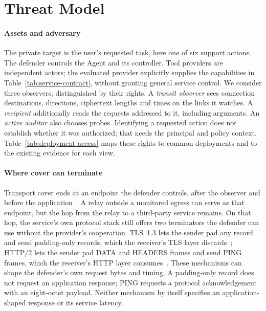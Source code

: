\section{Threat Model}\label{sec:threat}
\paragraph{Assets and adversary}
The private target is the user's requested task, here one of six support actions. The defender controls the Agent and its controller. Tool providers are independent actors; the evaluated provider explicitly supplies the capabilities in Table~\ref{tab:service-contract}, without granting general service control. We consider three observers, distinguished by their rights. A \emph{transit observer} sees connection destinations, directions, ciphertext lengths and times on the links it watches. A \emph{recipient} additionally reads the requests addressed to it, including arguments. An \emph{active auditor} also chooses probes. Identifying a requested action does not establish whether it was authorized; that needs the principal and policy context. Table~\ref{tab:deployment-access} maps these rights to common deployments and to the existing evidence for each view.



\paragraph{Where cover can terminate}
Transport cover ends at an endpoint the defender controls, after the observer and before the application~\cite{apthorpe2019stp}. A relay outside a monitored egress can serve as that endpoint, but the hop from the relay to a third-party service remains. On that hop, the service's own protocol stack still offers two terminators the defender can use without the provider's cooperation. TLS~1.3 lets the sender pad any record and send padding-only records, which the receiver's TLS layer discards~\cite[Sec.~5.4]{rfc8446}; HTTP/2 lets the sender pad DATA and HEADERS frames and send PING frames, which the receiver's HTTP layer consumes~\cite[Secs.~6.1, 6.7]{rfc9113}. These mechanisms can shape the defender's own request bytes and timing. A padding-only record does not request an application response; PING requests a protocol acknowledgement with an eight-octet payload. Neither mechanism by itself specifies an application-shaped response or its service latency.

